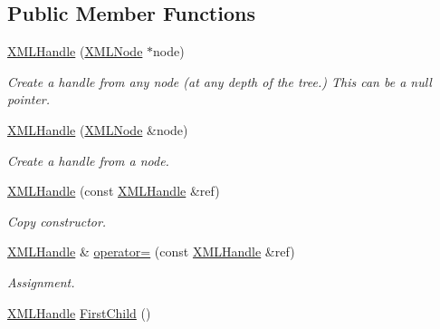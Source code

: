 \subsection*{Public Member Functions}
\begin{DoxyCompactItemize}
\item 
\hyperlink{classtinyxml2_1_1XMLHandle_a9c240a35c18f053509b4b97ddccd9793}{X\+M\+L\+Handle} (\hyperlink{classtinyxml2_1_1XMLNode}{X\+M\+L\+Node} $\ast$node)\hypertarget{classtinyxml2_1_1XMLHandle_a9c240a35c18f053509b4b97ddccd9793}{}\label{classtinyxml2_1_1XMLHandle_a9c240a35c18f053509b4b97ddccd9793}

\begin{DoxyCompactList}\small\item\em Create a handle from any node (at any depth of the tree.) This can be a null pointer. \end{DoxyCompactList}\item 
\hyperlink{classtinyxml2_1_1XMLHandle_aa2edbc1c0d3e3e8259bd98de7f1cf500}{X\+M\+L\+Handle} (\hyperlink{classtinyxml2_1_1XMLNode}{X\+M\+L\+Node} \&node)\hypertarget{classtinyxml2_1_1XMLHandle_aa2edbc1c0d3e3e8259bd98de7f1cf500}{}\label{classtinyxml2_1_1XMLHandle_aa2edbc1c0d3e3e8259bd98de7f1cf500}

\begin{DoxyCompactList}\small\item\em Create a handle from a node. \end{DoxyCompactList}\item 
\hyperlink{classtinyxml2_1_1XMLHandle_afd8e01e6018c07347b8e6d80272466aa}{X\+M\+L\+Handle} (const \hyperlink{classtinyxml2_1_1XMLHandle}{X\+M\+L\+Handle} \&ref)\hypertarget{classtinyxml2_1_1XMLHandle_afd8e01e6018c07347b8e6d80272466aa}{}\label{classtinyxml2_1_1XMLHandle_afd8e01e6018c07347b8e6d80272466aa}

\begin{DoxyCompactList}\small\item\em Copy constructor. \end{DoxyCompactList}\item 
\hyperlink{classtinyxml2_1_1XMLHandle}{X\+M\+L\+Handle} \& \hyperlink{classtinyxml2_1_1XMLHandle_a75b908322bb4b83be3281b6845252b20}{operator=} (const \hyperlink{classtinyxml2_1_1XMLHandle}{X\+M\+L\+Handle} \&ref)\hypertarget{classtinyxml2_1_1XMLHandle_a75b908322bb4b83be3281b6845252b20}{}\label{classtinyxml2_1_1XMLHandle_a75b908322bb4b83be3281b6845252b20}

\begin{DoxyCompactList}\small\item\em Assignment. \end{DoxyCompactList}\item 
\hyperlink{classtinyxml2_1_1XMLHandle}{X\+M\+L\+Handle} \hyperlink{classtinyxml2_1_1XMLHandle_a536447dc7f54c0cd11e031dad94795ae}{First\+Child} ()\hypertarget{classtinyxml2_1_1XMLHandle_a536447dc7f54c0cd11e031dad94795ae}{}\label{classtinyxml2_1_1XMLHandle_a536447dc7f54c0cd11e031dad94795ae}


\end{DoxyCompactItemize}
